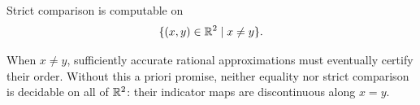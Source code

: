 \begin{theorem}
Strict comparison is computable on
\[
 \{(x, y)\in\mathbb{R}^2\mid x\ne y\}.
\]
\end{theorem}

\begin{remark}
When $x\ne y$, sufficiently accurate rational approximations
must eventually certify their order. Without this a priori
promise, neither equality nor strict comparison is decidable
on all of $\mathbb{R}^2$: their indicator maps are discontinuous
along $x=y$.
\end{remark}
